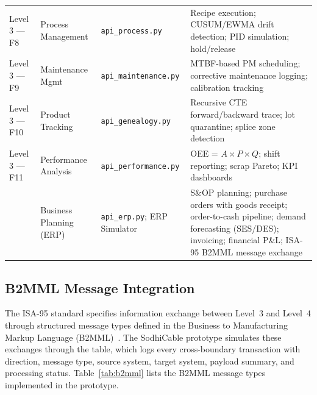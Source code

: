 \begin{table}[H]
\begin{tabularx}{\textwidth}{@{} l L{2.4cm} L{3.0cm} L{5.5cm} @{}}
Level 3 --- F8 & Process Management & \texttt{api\_process.py} & Recipe execution; CUSUM/EWMA drift detection; PID simulation; hold/release \\
Level 3 --- F9 & Maintenance Mgmt & \texttt{api\_maintenance.py} & MTBF-based PM scheduling; corrective maintenance logging; calibration tracking \\
Level 3 --- F10 & Product Tracking & \texttt{api\_genealogy.py} & Recursive CTE forward/backward trace; lot quarantine; splice zone detection \\
Level 3 --- F11 & Performance Analysis & \texttt{api\_performance.py} & OEE = $A \times P \times Q$; shift reporting; scrap Pareto; KPI dashboards \\
\addlinespace[3pt]
 & Business Planning (ERP) & \texttt{api\_erp.py}; ERP Simulator & S\&OP planning; purchase orders with goods receipt; order-to-cash pipeline; demand forecasting (SES/DES); invoicing; financial P\&L; ISA-95 B2MML message exchange \\
\bottomrule
\end{tabularx}
\end{table}


\subsection{B2MML Message Integration}

The ISA-95 standard specifies information exchange between Level~3 and Level~4
through structured message types defined in the Business to Manufacturing Markup
Language (B2MML)~\cite{b2mml}.  The SodhiCable prototype simulates these
exchanges through the  table, which logs every
cross-boundary transaction with direction, message type, source system, target
system, payload summary, and processing status.  Table~\ref{tab:b2mml} lists
the B2MML message types implemented in the prototype.

